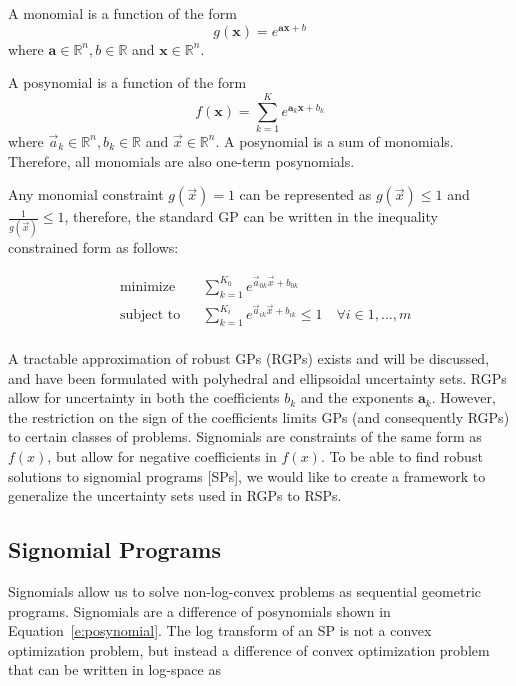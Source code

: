 A monomial is a function of the form
\begin{equation}\label{e:monomial}
g(\mathbf{x}) = e^{\mathbf{a}\mathbf{x} + b}
\end{equation}
where $\mathbf{a} \in \mathbb{R}^n, b \in \mathbb{R}$ and $\mathbf{x} \in \mathbb{R}^n$.

A posynomial is a function of the form
\begin{equation}\label{e:posynomial}
f(\mathbf{x}) = \sum_{k=1}^{K}e^{\mathbf{a}_k\mathbf{x} + b_k}
\end{equation}
where $\vec{a}_k \in \mathbb{R}^n, b_k \in \mathbb{R}$ and $\vec{x} \in \mathbb{R}^n$. A posynomial is a sum of monomials. Therefore, all monomials are also one-term posynomials.

Any monomial constraint $g(\vec{x}) = 1$ can be represented as $g(\vec{x}) \leq 1$ and $\frac{1}{g(\vec{x})} \leq 1$, therefore, the standard GP can be written in the inequality constrained form as follows:

\begin{equation}
\begin{aligned}
& \text{minimize} && \textstyle{\sum}_{k=1}^{K_0}e^{\vec{a}_{0k}\vec{x} + b_{0k}} \\
& \text{subject to} && \textstyle{\sum}_{k=1}^{K_i}e^{\vec{a}_{ik}\vec{x} + b_{ik}} \leq 1 \quad \forall i \in 1,...,m\\
\end{aligned}
\label{GP_inequality}
\end{equation}

A tractable approximation of robust GPs (RGPs) exists and will be discussed, and have been formulated with polyhedral and ellipsoidal uncertainty sets. RGPs allow for uncertainty in both the coefficients $b_k$ and the exponents $\mathbf{a}_{k}$. However, the restriction on the sign of the coefficients limits GPs (and consequently RGPs) to certain classes of problems. Signomials are constraints of the same form as $f(x)$, but allow for negative coefficients in $f(x)$. To be able to find robust solutions to signomial programs [SPs], we would like to create a framework to generalize the uncertainty sets used in RGPs to RSPs.


\subsection{Signomial Programs}

Signomials allow us to solve non-log-convex problems as sequential geometric programs. Signomials are a difference of posynomials shown in Equation~\ref{e:posynomial}. The log transform of an SP is not a convex optimization problem, but instead a difference of convex optimization problem that can be written in log-space as

